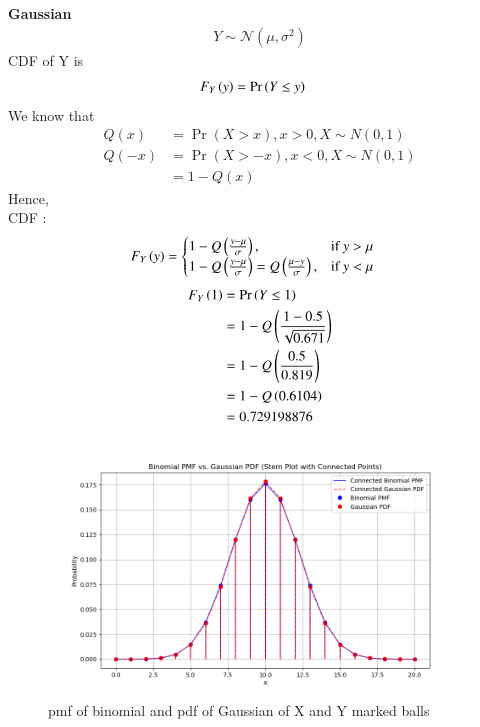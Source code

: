 \documentclass[journal,12pt,onecolumn]{IEEEtran}
\providecommand{\pr}[1]{\ensuremath{\Pr\left(#1\right)}}
\providecommand{\qfunc}[1]{\ensuremath{Q\left(#1\right)}}
\providecommand{\qfunc}[1]{\ensuremath{Q\left(#1\right)}}
\providecommand{\gauss}[2]{\mathcal{N}\ensuremath{\left(#1,#2\right)}}
\begin{document}
\textbf{Gaussian}
\begin{align}
Y \sim \gauss{\mu}{\sigma^2}
\end{align}
CDF of Y is
\begin{align}
F_{Y}\brak{y} &= \pr{Y \leq y}
\end{align}
We know that 
\begin{align}
\qfunc{x} &= \pr{X > x}, x > 0, X \sim N(0,1)\\
\qfunc{-x} &= \pr{X > -x}, x < 0, X \sim N(0,1)\\
&= 1 - \qfunc{x}
\end{align}
Hence,\\
CDF :
\begin{align}
F_Y\brak{y} &= \begin{cases}
                 1 - \qfunc{\frac{y - \mu}{\sigma}},& \text{if $y > \mu$}\\
                 1 - \qfunc{\frac{y - \mu}{\sigma}} = \qfunc{\frac{\mu - y}{\sigma}},& \text{if $y < \mu$}
               \end{cases}
\end{align}
\begin{align}
F_Y\brak{1} &= \pr{Y \leq 1}\\
&= 1 - \qfunc{\frac{1 - 0.5}{\sqrt{0.671}}}\\
&= 1 - \qfunc{\frac{0.5}{0.819}}\\
&= 1 - \qfunc{0.6104}\\
&= 0.729198876
\end{align}
\begin{figure}[!ht]
\centering
\includegraphics[width=\columnwidth]{figs/Fig1.png}
\caption{pmf of binomial and pdf of Gaussian of X and Y marked balls}
\label{fig:gaussian/9/3/33/}
\end{figure}
\end{document}

